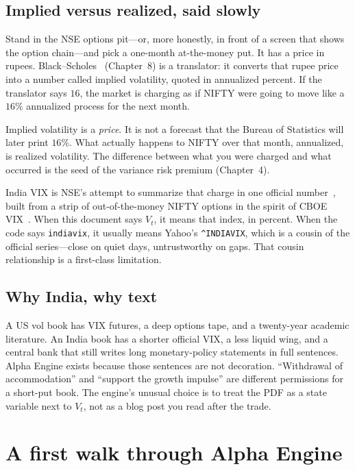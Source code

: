 \documentclass[11pt,a4paper]{article}
\begin{document}
\subsection{Implied versus realized, said slowly}

Stand in the NSE options pit---or, more honestly, in front of a screen that shows the option chain---and pick a one-month at-the-money put. It has a price in rupees. Black--Scholes~\cite{blackscholes1973} (Chapter~8) is a translator: it converts that rupee price into a number called implied volatility, quoted in annualized percent. If the translator says $16$, the market is charging as if NIFTY were going to move like a $16\%$ annualized process for the next month.

Implied volatility is a \emph{price}. It is not a forecast that the Bureau of Statistics will later print $16\%$. What actually happens to NIFTY over that month, annualized, is realized volatility. The difference between what you were charged and what occurred is the seed of the variance risk premium (Chapter~4).

India VIX is NSE's attempt to summarize that charge in one official number~\cite{nsevix}, built from a strip of out-of-the-money NIFTY options in the spirit of CBOE VIX~\cite{cboevix}. When this document says $V_t$, it means that index, in percent. When the code says \texttt{indiavix}, it usually means Yahoo's \texttt{\^{}INDIAVIX}, which is a cousin of the official series---close on quiet days, untrustworthy on gaps. That cousin relationship is a first-class limitation.

\subsection{Why India, why text}

A US vol book has VIX futures, a deep options tape, and a twenty-year academic literature. An India book has a shorter official VIX, a less liquid wing, and a central bank that still writes long monetary-policy statements in full sentences. Alpha Engine exists because those sentences are not decoration. ``Withdrawal of accommodation'' and ``support the growth impulse'' are different permissions for a short-put book. The engine's unusual choice is to treat the PDF as a state variable next to $V_t$, not as a blog post you read after the trade.

\section{A first walk through Alpha Engine}
\end{document}
